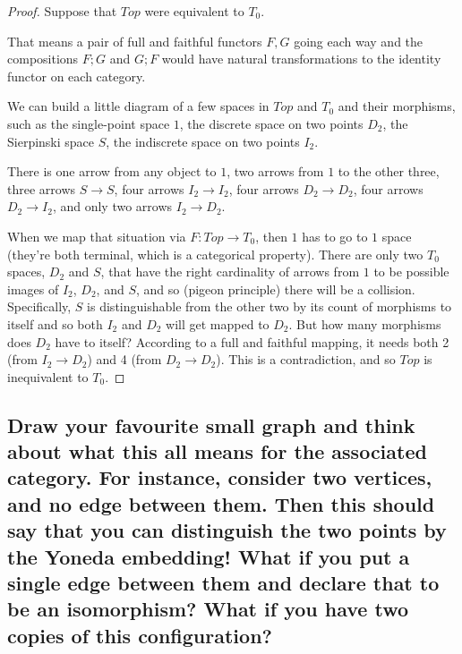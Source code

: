 \documentclass{proc-l}
\theoremstyle{definition}
\theoremstyle{remark}
\numberwithin{equation}{section}
\begin{document}
\begin{proof}
Suppose that $Top$ were equivalent to $T_0$.

That means a pair of full and faithful functors $F, G$ going each way and the compositions $F;G$ and $G;F$ would have natural transformations to the identity functor on each category.

We can build a little diagram of a few spaces in $Top$ and $T_0$ and their morphisms, such as the single-point space $1$, the discrete space on two points $D_2$, the Sierpinski space $S$, the indiscrete space on two points $I_2$.

There is one arrow from any object to $1$, two arrows from $1$ to the other three, three arrows $S \rightarrow S$, four arrows $I_2 \rightarrow I_2$, four arrows $D_2 \rightarrow D_2$, four arrows $D_2 \rightarrow I_2$, and only two arrows $I_2 \rightarrow D_2$.

When we map that situation via $F : Top \rightarrow T_0$, then $1$ has to go to $1$ space (they're both terminal, which is a categorical property). There are only two $T_0$ spaces, $D_2$ and $S$, that have the right cardinality of arrows from $1$ to be possible images of $I_2$, $D_2$, and $S$, and so (pigeon principle) there will be a collision. Specifically, $S$ is distinguishable from the other two by its count of morphisms to itself and so both $I_2$ and $D_2$ will get mapped to $D_2$. But how many morphisms does $D_2$ have to itself? According to a full and faithful mapping, it needs both 2 (from $I_2 \rightarrow D_2$) and 4 (from $D_2 \rightarrow D_2$). This is a contradiction, and so $Top$ is inequivalent to $T_0$.
\end{proof}



\subsection{Draw your favourite small graph and think about what this all means for the associated category. For instance, consider two vertices, and no edge between them. Then this should say that you can distinguish the two points by the Yoneda embedding! What if you put a single edge between them and declare that to be an isomorphism? What if you have two copies of this configuration?}

\end{document}

